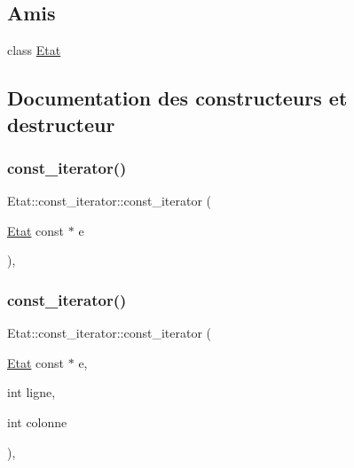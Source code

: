 \subsection*{Amis}
\begin{DoxyCompactItemize}
\item 
class \mbox{\hyperlink{class_etat_1_1const__iterator_af495e82aa15594b628d4192e8ecb688b}{Etat}}
\end{DoxyCompactItemize}


\subsection{Documentation des constructeurs et destructeur}
\mbox{\label{class_etat_1_1const__iterator_ae5a815d5f85c30947c23ed7ac183d1f0}} 
\subsubsection{\texorpdfstring{const\+\_\+iterator()}{const\_iterator()}\hspace{0.1cm}{\footnotesize\ttfamily [1/2]}}
{\footnotesize\ttfamily Etat\+::const\+\_\+iterator\+::const\+\_\+iterator (\begin{DoxyParamCaption}\item[{\mbox{\hyperlink{class_etat}{Etat}} const $\ast$}]{e }\end{DoxyParamCaption})\hspace{0.3cm}{\ttfamily [inline]}, {\ttfamily [private]}}

\mbox{\label{class_etat_1_1const__iterator_a4cfe1559f1698f877a658d8e86a59cc2}} 
\subsubsection{\texorpdfstring{const\+\_\+iterator()}{const\_iterator()}\hspace{0.1cm}{\footnotesize\ttfamily [2/2]}}
{\footnotesize\ttfamily Etat\+::const\+\_\+iterator\+::const\+\_\+iterator (\begin{DoxyParamCaption}\item[{\mbox{\hyperlink{class_etat}{Etat}} const $\ast$}]{e,  }\item[{int}]{ligne,  }\item[{int}]{colonne }\end{DoxyParamCaption})\hspace{0.3cm}{\ttfamily [inline]}, {\ttfamily [private]}}

